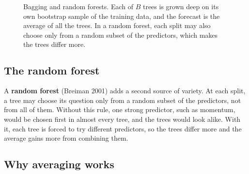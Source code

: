 \begin{figure}[htbp]
  \centering
  \caption{Bagging and random forests. Each of $B$ trees is grown deep on its own
    bootstrap sample of the training data, and the forecast is the average of
    all the trees. In a random forest, each split may also choose only from a
    random subset of the predictors, which makes the trees differ more.}
  \label{fig:19-ensembles}
\end{figure}

\subsection{The random forest}

A \textbf{random forest} (Breiman 2001) adds a second source of variety. At each split, a tree may choose its question only from a random subset of the predictors, not from all of them. Without this rule, one strong predictor, such as momentum, would be chosen first in almost every tree, and the trees would look alike. With it, each tree is forced to try different predictors, so the trees differ more and the average gains more from combining them.

\subsection{Why averaging works}

